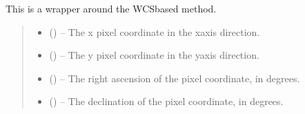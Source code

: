 \documentclass[letterpaper,11pt,english]{sphinxmanual}
\begin{document}
\begin{savenotes}
\begin{fulllineitems}
\begin{savenotes}
\begin{fulllineitems}
\sphinxAtStartPar
This is a wrapper around the WCS\sphinxhyphen{}based method.
\begin{quote}\begin{description}
\begin{itemize}
\item {} 
\sphinxAtStartPar
{} () – The x pixel coordinate in the x\sphinxhyphen{}axis direction.

\item {} 
\sphinxAtStartPar
{} () – The y pixel coordinate in the y\sphinxhyphen{}axis direction.

\end{itemize}

\sphinxAtStartPar
\begin{itemize}
\item {} 
\sphinxAtStartPar
{} () – The right ascension of the pixel coordinate, in degrees.

\item {} 
\sphinxAtStartPar
{} () – The declination of the pixel coordinate, in degrees.

\end{itemize}


\end{description}\end{quote}

\end{fulllineitems}\end{savenotes}



\end{fulllineitems}
\end{savenotes}
\end{document}
